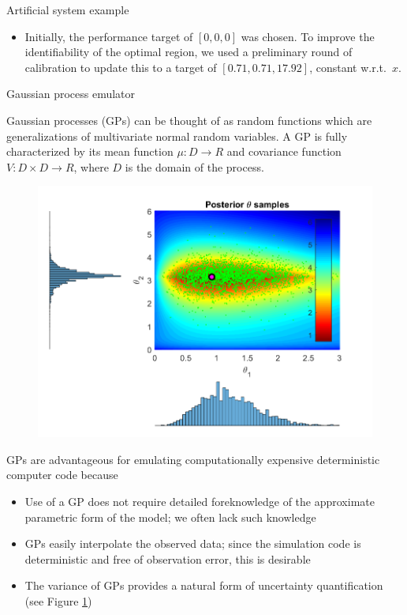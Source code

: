 \documentclass[final]{beamer}
\newlength{\onecolwid}
\newlength{\twocolwid}
\begin{document}
\begin{frame}[t]
\begin{columns}[t]
\begin{column}{\twocolwid}
\begin{columns}[t,totalwidth=\twocolwid]
\begin{column}{\onecolwid}
\begin{alertblock}{Artificial system example}
\begin{itemize}
\item Initially, the performance target of $[0,0,0]$ was chosen. To improve the identifiability of the optimal region, we used a preliminary round of calibration to update this to a target of $[0.71,0.71,17.92]$, constant w.r.t.\ $x$.

\end{itemize}
\end{alertblock}


\begin{alertblock}{Gaussian process emulator}

Gaussian processes (GPs) can be thought of as random functions which are generalizations of multivariate normal random variables\cite{OHagan1978}. A GP is fully characterized by its mean function $\mu:D\to R$ and covariance function $V:D\times D\to R$, where $D$ is the domain of the process.

\begin{figure}[h!]
\includegraphics[width=0.95\linewidth]{FIG_toy_sim_model_results}
\label{gp_ex}
\end{figure}



GPs are advantageous for emulating computationally expensive deterministic computer code\cite{Sacks1989,Santner2003a} because 
\begin{itemize}
\item Use of a GP does not require detailed foreknowledge of the approximate parametric form of the model; we often lack such knowledge
\item GPs easily interpolate the observed data; since the simulation code is deterministic and free of observation error, this is desirable
\item The variance of GPs provides a natural form of uncertainty quantification (see Figure \ref{gp_ex})
\end{itemize}




\end{alertblock}
\end{column}
\end{columns}
\end{column}
\end{columns}
\end{frame}
\end{document}
